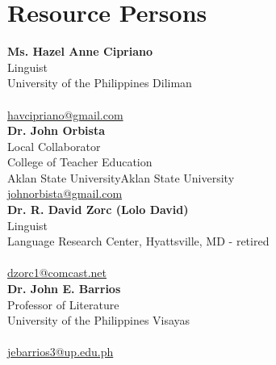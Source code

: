 %
%
%                 

\chapter{Resource Persons}
\label{sec:appendixb}

%
%
%
%

\newcommand{\resperson}[5]{%
    \textbf{#1} \\ %
    #2 \\          %
    #3 \\          %
    \ifx\empty#4\empty\else #4 \\ \fi %
    \url{#5}\vspace{0.5em}\\  %
}

\resperson{Ms. Hazel Anne Cipriano}{Linguist}{University of the Philippines Diliman}{}{havcipriano@gmail.com}
\resperson{Dr. John Orbista}{Local Collaborator}{College of Teacher Education}{Aklan State University}{johnorbista@gmail.com}
\resperson{Dr. R. David Zorc (Lolo David)}{Linguist}{Language Research Center, Hyattsville, MD - retired}{}{dzorc1@comcast.net}
\resperson{Dr. John E. Barrios}{Professor of Literature}{University of the Philippines Visayas}{}{jebarrios3@up.edu.ph}
